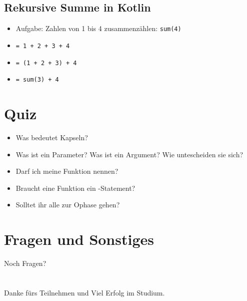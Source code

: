 \subsection{Rekursive Summe in Kotlin}
\begin{frame}
    \slidehead

    \begin{itemize}
        \item Aufgabe: Zahlen von 1 bis 4 zusammenzählen: \texttt{sum(4)} \pause
        \item \texttt{= 1 + 2 + 3 + 4} \pause
        \item \texttt{= (1 + 2 + 3) + 4} \pause
        \item \texttt{= sum(3) + 4}
    \end{itemize}
    \vspace{1em}
    \pause
\end{frame}

\livecoding


\subsection{}

\section{Quiz}
\begin{frame}
    \slidehead
    \begin{itemize}
        \item Was bedeutet Kapseln?
            \pause
        \item Was ist ein Parameter?
            Was ist ein Argument?
            Wie untescheiden sie sich?
            \pause
        \item Darf ich meine Funktion  nennen?
            \pause
        \item Braucht eine Funktion ein -Statement?
            \pause
        \item Solltet ihr alle zur Ophase gehen?
    \end{itemize}
\end{frame}

\section{Fragen und Sonstiges}
\begin{frame}
    \slidehead
    \vspace{1.8cm}
    \centering
    \huge Noch Fragen?
\end{frame}

\section{}
\subsection{}

\begin{frame}
    \slidehead
    \vspace{1.8cm}
    \centering
    \huge Danke fürs Teilnehmen und Viel Erfolg im Studium.
\end{frame}


